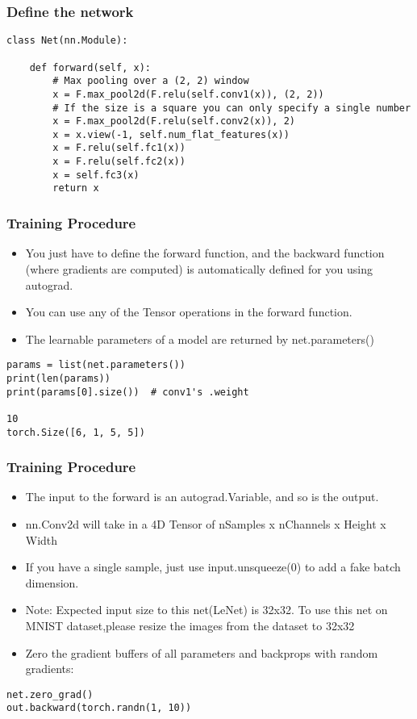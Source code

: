 \begin{frame}[fragile] \frametitle{Define the network}
\begin{lstlisting}
class Net(nn.Module):

    def forward(self, x):
        # Max pooling over a (2, 2) window
        x = F.max_pool2d(F.relu(self.conv1(x)), (2, 2))
        # If the size is a square you can only specify a single number
        x = F.max_pool2d(F.relu(self.conv2(x)), 2)
        x = x.view(-1, self.num_flat_features(x))
        x = F.relu(self.fc1(x))
        x = F.relu(self.fc2(x))
        x = self.fc3(x)
        return x
\end{lstlisting}
\end{frame}

\begin{frame}[fragile] \frametitle{ Training Procedure}
\begin{itemize}
\item You just have to define the forward function, and the backward function (where gradients are computed) is automatically defined for you using autograd. 
\item You can use any of the Tensor operations in the forward function.
\item The learnable parameters of a model are returned by net.parameters()
\end{itemize}
\begin{lstlisting}
params = list(net.parameters())
print(len(params))
print(params[0].size())  # conv1's .weight

10
torch.Size([6, 1, 5, 5])
\end{lstlisting}

\end{frame}

\begin{frame}[fragile] \frametitle{ Training Procedure}
\begin{itemize}
\item The input to the forward is an autograd.Variable, and so is the output. 
\item nn.Conv2d will take in a 4D Tensor of nSamples x nChannels x Height x Width 
\item If you have a single sample, just use input.unsqueeze(0) to add a fake batch dimension.
\item Note: Expected input size to this net(LeNet) is 32x32. To use this net on MNIST dataset,please resize the images from the dataset to 32x32
\item Zero the gradient buffers of all parameters and backprops with random gradients:
\end{itemize}
\begin{lstlisting}
net.zero_grad()
out.backward(torch.randn(1, 10))
\end{lstlisting}

\end{frame}


